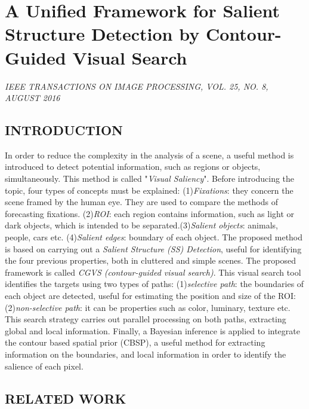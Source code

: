 \section{A Unified Framework for Salient Structure Detection by Contour-Guided Visual Search}

\begin{flushright}
    \author{
    Kai Fu Yang,
    Hui Li,
    Chao-Yi Li,
    and Young-Jie Li,
   \emph{Member}, 
    IEEE 
}
\end{flushright}

\begin{center}
    \emph{IEEE TRANSACTIONS ON IMAGE PROCESSING, VOL. 25, NO. 8, AUGUST 2016}
\end{center}

\subsection{INTRODUCTION}
In order to reduce the complexity in the analysis of a scene, a useful method 
is introduced to detect potential information, such as regions or 
objects, simultaneously. This method is called "\emph{Visual Saliency}". Before introducing
the topic, four types of concepts must be explained: (1)\emph{Fixations}: 
they concern the scene framed by the human eye. They are used to compare 
the methods of forecasting fixations. (2)\emph{ROI}: each region contains information, 
such as light or dark objects, which is intended to be separated.(3)\emph{Salient objects}: 
animals, people, cars etc. (4)\emph{Salient edges}: boundary of each object. The proposed 
method is based on carrying out a \emph{Salient Structure (SS) Detection},
useful for identifying the four previous properties, both in cluttered and 
simple scenes. The proposed framework is called \emph{CGVS (contour-guided visual 
search)}. This visual search tool identifies the targets using two types of 
paths: (1)\emph{selective path}: the boundaries of each object are detected, useful 
for estimating the position and size of the ROI: (2)\emph{non-selective path}: it 
can be properties such as color, luminary, texture etc. This search strategy 
carries out parallel processing on both paths, extracting global and local 
information. Finally, a Bayesian inference is applied to integrate the contour 
based spatial prior (CBSP), a useful method for extracting information on 
the boundaries, and local information in order to identify the salience of each 
pixel. 

\subsection{RELATED WORK}

